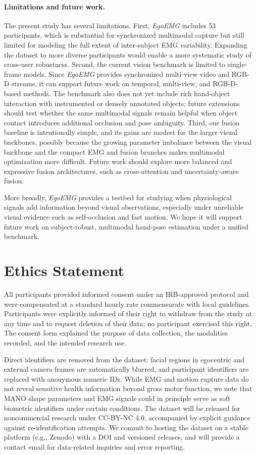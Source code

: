 \documentclass[letterpaper]{article} %
\newcommand{\dataset}{\textit{EgoEMG}}
\begin{document}
\paragraph{Limitations and future work.}
The present study has several limitations. First, \dataset{} includes 53
participants, which is substantial for synchronized multimodal capture but still
limited for modeling the full extent of inter-subject EMG variability. Expanding
the dataset to more diverse participants would enable a more systematic study of
cross-user robustness. Second, the current vision benchmark is limited to single-frame models.
Since \dataset{} provides synchronized multi-view video and RGB-D streams,
it can support future work on temporal, multi-view, and RGB-D-based methods.
The benchmark also does not yet include rich hand-object interaction with instrumented or
densely annotated objects; future extensions should test whether the same
multimodal signals remain helpful when object contact introduces additional
occlusion and pose ambiguity. Third, our fusion baseline is intentionally simple, and its gains are modest for the larger visual backbones, possibly because the growing parameter imbalance between the visual backbone and the compact EMG and fusion branches makes multimodal optimization more difficult. Future work should explore more balanced and expressive fusion architectures, such as cross-attention and uncertainty-aware fusion.

More broadly, \dataset{} provides a testbed for studying when physiological
signals add information beyond visual observations, especially under unreliable
visual evidence such as self-occlusion and fast motion. We hope it will support
future work on subject-robust, multimodal hand-pose estimation under a unified
benchmark.

\section*{Ethics Statement}

All participants provided informed consent under an IRB-approved protocol and were compensated at a standard hourly rate commensurate with local guidelines. Participants were explicitly informed of their right to withdraw from the study at any time and to request deletion of their data; no participant exercised this right. The consent form explained the purpose of data collection, the modalities recorded, and the intended research use.

Direct identifiers are removed from the dataset: facial regions in egocentric and external camera frames are automatically blurred, and participant identifiers are replaced with anonymous numeric IDs. While EMG and motion capture data do not reveal sensitive health information beyond gross motor function, we note that MANO shape parameters and EMG signals could in principle serve as soft biometric identifiers under certain conditions. The dataset will be released for noncommercial research under CC-BY-NC 4.0, accompanied by explicit guidance against re-identification attempts. We commit to hosting the dataset on a stable platform (e.g., Zenodo) with a DOI and versioned releases, and will provide a contact email for data-related inquiries and error reporting.
\end{document}
